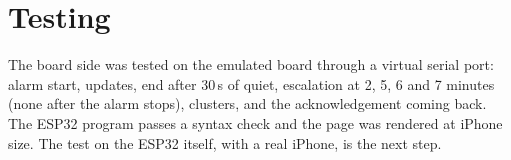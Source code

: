 \section{Testing}

The board side was tested on the emulated board through a virtual serial port: alarm start, updates, end after 30\,s
of quiet, escalation at 2, 5, 6 and 7 minutes (none after the alarm stops), clusters, and the acknowledgement coming
back. The ESP32 program passes a syntax check and the page was rendered at iPhone size. The test on the ESP32 itself,
with a real iPhone, is the next step.

